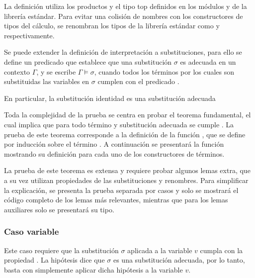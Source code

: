 
La definición utiliza los productos \func{$\_\times\_$} y el tipo top \type{$\top$} definidos en los módulos  y  de la librería estándar.
Para evitar una colisión de nombres con los constructores de tipos del cálculo, se renombran los tipos de la librería estándar como \func{$\_\otimes\_$} y  respectivamente.

Se puede extender la definición de interpretación a substituciones, para ello se define un predicado que establece que una substitución $\sigma$ es adecuada en un contexto $\Gamma$, y se escribe $\Gamma \vDash \sigma$, cuando todos los términos por los cuales son substituidas las variables en $\sigma$ cumplen con el predicado \snstar.


En particular, la substitución identidad  es una substitución adecuada


Toda la complejidad de la prueba se centra en probar el teorema fundamental, el cual implica que para todo término  y substitución adecuada  se cumple
\snstar{}.
La prueba de este teorema corresponde a la definición de la función , que se define por inducción sobre el término .
A continuación se presentará la función mostrando su definición para cada uno de los constructores de términos.


La prueba de este teorema es extensa y requiere probar algunos lemas extra, que a su vez utilizan propiedades de las substituciones y renombres.
Para simplificar la explicación, se presenta la prueba separada por casos y solo se mostrará el código completo de los lemas más relevantes, mientras que para los lemas auxiliares solo se presentará su tipo.

\subsubsection{Caso variable}

Este caso requiere que la substitución $\sigma$ aplicada a la variable $v$ cumpla con la propiedad
\snstar.
La hipótesis dice que $\sigma$ es una substitución adecuada, por lo tanto, basta con simplemente aplicar dicha hipótesis a la variable $v$.

